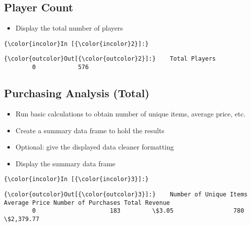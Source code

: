 \documentclass[11pt]{article}
\providecommand{\tightlist}{%
      \setlength{\itemsep}{0pt}\setlength{\parskip}{0pt}}
\begin{document}
    \hypertarget{player-count}{%
\subsection{Player Count}\label{player-count}}

    \begin{itemize}
\tightlist
\item
  Display the total number of players
\end{itemize}

    \begin{Verbatim}[commandchars=\\\{\}]
{\color{incolor}In [{\color{incolor}2}]:} 
\end{Verbatim}


\begin{Verbatim}[commandchars=\\\{\}]
{\color{outcolor}Out[{\color{outcolor}2}]:}    Total Players
        0            576
\end{Verbatim}
            
    \hypertarget{purchasing-analysis-total}{%
\subsection{Purchasing Analysis
(Total)}\label{purchasing-analysis-total}}

    \begin{itemize}
\item
  Run basic calculations to obtain number of unique items, average
  price, etc.
\item
  Create a summary data frame to hold the results
\item
  Optional: give the displayed data cleaner formatting
\item
  Display the summary data frame
\end{itemize}

    \begin{Verbatim}[commandchars=\\\{\}]
{\color{incolor}In [{\color{incolor}3}]:} 
\end{Verbatim}


\begin{Verbatim}[commandchars=\\\{\}]
{\color{outcolor}Out[{\color{outcolor}3}]:}    Number of Unique Items Average Price Number of Purchases Total Revenue
        0                     183         \$3.05                 780     \$2,379.77
\end{Verbatim}
            
\end{document}
